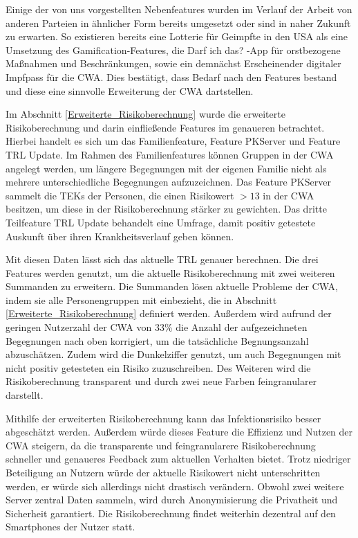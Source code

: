 \documentclass[conference,compsoc]{IEEEtran}
\begin{document}
Einige der von uns vorgestellten Nebenfeatures wurden im Verlauf der Arbeit von anderen Parteien in ähnlicher Form bereits umgesetzt oder sind in naher Zukunft zu erwarten.
So existieren bereits eine Lotterie für Geimpfte in den USA als eine Umsetzung des Gamification-Features, 
die \glqq Darf ich das? \grqq -App für orstbezogene Maßnahmen und Beschränkungen, 
sowie ein demnächst Erscheinender digitaler Impfpass für die CWA. 
Dies bestätigt, dass Bedarf nach den Features bestand und diese eine sinnvolle Erweiterung der CWA dartstellen.

Im Abschnitt \ref{Erweiterte_Risikoberechnung} wurde die erweiterte Risikoberechnung und darin einfließende Features im genaueren betrachtet. 
Hierbei handelt es sich um das Familienfeature, Feature PKServer und Feature TRL Update. 
Im Rahmen des Familienfeatures können Gruppen in der CWA angelegt werden, um längere Begegnungen mit der eigenen Familie nicht als mehrere unterschiedliche Begegnungen aufzuzeichnen. 
Das Feature PKServer sammelt die TEKs der Personen, die einen Risikowert $>13$ in der CWA besitzen, um diese in der Risikoberechnung stärker zu gewichten. 
Das dritte Teilfeature TRL Update behandelt eine Umfrage, damit positiv getestete Auskunft über ihren Krankheitsverlauf geben können.

Mit diesen Daten lässt sich das aktuelle TRL genauer berechnen.
Die drei Features werden genutzt, um die aktuelle Risikoberechnung mit zwei weiteren Summanden zu erweitern.
Die Summanden lösen aktuelle Probleme der CWA, indem sie alle Personengruppen mit einbezieht, die in Abschnitt \ref{Erweiterte_Risikoberechnung} definiert werden.
Außerdem wird aufrund der geringen Nutzerzahl der CWA von 33\% die Anzahl der aufgezeichneten Begegnungen nach oben korrigiert, um die tatsächliche Begnungsanzahl abzuschätzen. 
Zudem wird die Dunkelziffer genutzt, um auch Begegnungen mit nicht positiv getesteten ein Risiko zuzuschreiben.
Des Weiteren wird die Risikoberechnung transparent und durch zwei neue Farben feingranularer darstellt.

Mithilfe der erweiterten Risikoberechnung kann das Infektionsrisiko besser abgeschätzt werden.
Außerdem würde dieses Feature die Effizienz und Nutzen der CWA steigern, da die transparente und feingranularere Risikoberechnung schneller und genaueres Feedback zum aktuellen Verhalten bietet. 
Trotz niedriger Beteiligung an Nutzern würde der aktuelle Risikowert nicht unterschritten werden, er würde sich allerdings nicht drastisch verändern.
Obwohl zwei weitere Server zentral Daten sammeln, wird durch Anonymisierung die Privatheit und Sicherheit garantiert.
Die Risikoberechnung findet weiterhin dezentral auf den Smartphones der Nutzer statt. 
\end{document}
